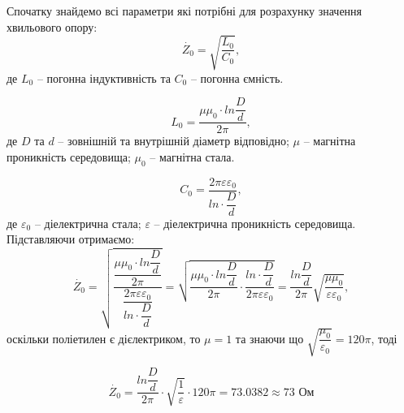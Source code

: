 \documentclass[a4paper,14pt]{extreport}
\begin{document}
Спочатку знайдемо всі параметри які потрібні для розрахунку значення хвильового опору:
\begin{equation}\label{eq1}
\dot{Z_{0}} = \sqrt{\dfrac{L_{0}}{C_{0}}},
\end{equation}
де $L_{0}$ -- погонна індуктивність та $C_{0}$ -- погонна ємність.

\begin{equation}\label{eq2}
L_{0} = \dfrac{\mu\mu_{0}\cdot ln\dfrac{D}{d}}{2\pi},
\end{equation}
де $D$ та $d$ -- зовнішній та внутрішній діаметр відповідно; $\mu$ -- магнітна проникність середовища; $\mu_0$ -- магнітна стала.


\begin{equation}\label{eq3}
C_{0} = \dfrac{2\pi \varepsilon \varepsilon_0}{ln\cdot\dfrac{D}{d}},
\end{equation}
де $\varepsilon_0$ -- діелектрична стала; $\varepsilon$ -- діелектрична проникність середовища. \\

Підставляючи отримаємо:
\begin{equation}\label{eq4}
\dot{Z_{0}} =\sqrt{ \dfrac{\dfrac{\mu\mu_{0}\cdot ln\dfrac{D}{d}}{2\pi}}{\dfrac{2\pi \varepsilon \varepsilon_0}{ln\cdot\dfrac{D}{d}}}}
=\sqrt{\dfrac{\mu\mu_{0}\cdot ln\dfrac{D}{d}}{2\pi}\cdot \dfrac{ln\cdot\dfrac{D}{d}}{2\pi \varepsilon \varepsilon_0}} = \dfrac{ln\dfrac{D}{d}}{2\pi}\sqrt{\dfrac{\mu\mu_{0}}{ \varepsilon \varepsilon_0} },
\end{equation}
оскільки поліетилен є дієлектриком, то $\mu = 1$ та знаючи що $\sqrt{\dfrac{\mu_{0}}{\varepsilon_0}} = 120\pi$, тоді

\begin{equation}\label{eq5}
\dot{Z_{0}} = \dfrac{ln\dfrac{D}{d}}{2\pi} \cdot \sqrt{\dfrac{1}{\varepsilon}} \cdot 120\pi = 73.0382\approx 73 \text{ Ом}
\end{equation}
\end{document}
